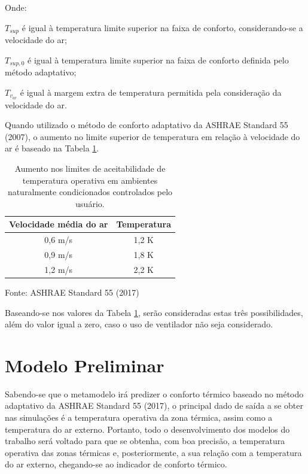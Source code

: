 \documentclass[brazil,hardcopy,openany,a5paper]{ufscthesis}
\begin{document}
	Onde:
	
	$T_{sup}$ é igual à temperatura limite superior na faixa de conforto, considerando-se a velocidade do ar;
	
	$T_{sup,0}$ é igual à temperatura limite superior na faixa de conforto definida pelo método adaptativo;
	
	$T_{v_{ar}}$ é igual à margem extra de temperatura permitida pela consideração da velocidade do ar.
	
	Quando utilizado o método de conforto adaptativo da ASHRAE Standard 55 (2007), o aumento no limite superior de temperatura em relação à velocidade do ar é baseado na Tabela \ref{table:var}.		
	
	\begin{table}[!h]
		\centering
		\caption{Aumento nos limites de aceitabilidade de temperatura operativa em ambientes naturalmente condicionados controlados pelo usuário.}
		\label{table:var}
		\begin{tabular}{|c |c |}
			\hline
			\textbf{Velocidade média do ar} & \textbf{Temperatura} \\
			\hline
			0,6 m/s & 1,2 K \\
			\hline
			0,9 m/s & 1,8 K \\
			\hline
			1,2 m/s & 2,2 K \\
			\hline 
		\end{tabular}
		\begin{flushleft}
			Fonte: ASHRAE Standard 55 (2017)
		\end{flushleft}				
	\end{table}
	
	Baseando-se nos valores da Tabela \ref{table:var}, serão consideradas estas três possibilidades, além do valor igual a zero, caso o uso de ventilador não seja considerado.
	
	\section{Modelo Preliminar}
	
	Sabendo-se que o metamodelo irá predizer o conforto térmico baseado no método adaptativo da ASHRAE Standard 55 (2017), o principal dado de saída a se obter nas simulações é a temperatura operativa da zona térmica, assim como a temperatura do ar externo. Portanto, todo o desenvolvimento dos modelos do trabalho será voltado para que se obtenha, com boa precisão, a temperatura operativa das zonas térmicas e, posteriormente, a sua relação com a temperatura do ar externo, chegando-se ao indicador de conforto térmico.
	
\end{document}
